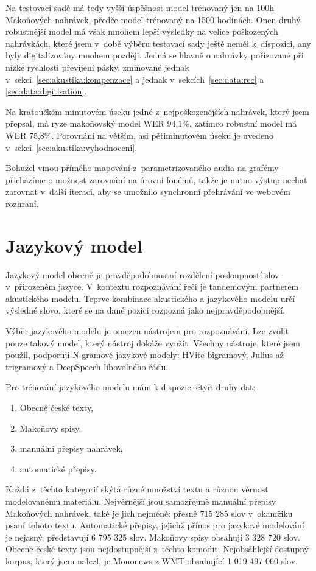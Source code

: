Na testovací sadě má tedy vyšší úspěšnost model trénovaný jen na 100h Makoňových
nahrávek, předče model trénovaný na 1500 hodinách. Onen druhý robustnější model
má však mnohem lepší výsledky na velice poškozených nahrávkách, které jsem
v~době výběru testovací sady ještě neměl k~dispozici, any byly digitalizovány
mnohem později. Jedná se hlavně o nahrávky pořizované při nízké rychlosti
převíjení pásky, zmiňované jednak v~sekci~\ref{sec:akustika:kompenzace} a jednak
v~sekcích~\ref{sec:data:rec} a \ref{sec:data:digitisation}.

Na kraťoučkém minutovém úseku jedné z~nejpoškozenějších nahrávek, který jsem
přepsal, má ryze makoňovský model WER 94,1\%, zatímco robustní model má WER
75,8\%. Porovnání na větším, asi pětiminutovém úseku je uvedeno
v~sekci~\ref{sec:akustika:vyhodnoceni}.

Bohužel vinou přímého mapování z~parametrizovaného audia na grafémy přicházíme o
možnost zarovnání na úrovni fonémů, takže je nutno výstup nechat zarovnat
v~další iteraci, aby se umožnilo synchronní přehrávání ve webovém rozhraní.

\section{Jazykový model}
\label{sec:jazykovy-model}

Jazykový model obecně je pravděpodobnostní rozdělení posloupností slov
v~přirozeném jazyce.\cite{ponte1998language} V~kontextu rozpoznávání řeči je tandemovým
partnerem akustického modelu.\cite{jelinek1990self} Teprve kombinace akustického
a jazykového modelu určí výsledné slovo, které se na dané pozici rozpozná jako
nejpravděpodobnější.

Výběr jazykového modelu je omezen nástrojem pro rozpoznávání. Lze zvolit pouze
takový model, který nástroj dokáže využít. Všechny nástroje, které jsem použil,
podporují N-gramové jazykové modely: HVite bigramový, Julius až trigramový a
DeepSpeech libovolného řádu.

Pro trénování jazykového modelu mám k dispozici čtyři druhy dat:
\begin{enumerate}
\item{Obecné české texty,}
\item{Makoňovy spisy,}
\item{manuální přepisy nahrávek,}
\item{automatické přepisy.}
\end{enumerate}

Každá z~těchto kategorií skýtá různé množství textu a různou věrnost
modelovanému materiálu. Nejvěrnější jsou samozřejmě manuální přepisy Makoňových
nahrávek, také je jich nejméně: přesně 715 285 slov v~okamžiku psaní tohoto
textu. Automatické přepisy, jejichž přínos pro jazykové modelování je nejasný,
představují 6 795 325 slov. Makoňovy spisy obsahují 3 328 720 slov. Obecné české
texty jsou nejdostupnější z~těchto komodit. Nejobsáhlejší dostupný korpus, který
jsem nalezl, je Mononews z WMT\cite{wmt19} obsahující 1 019 497 060 slov.

